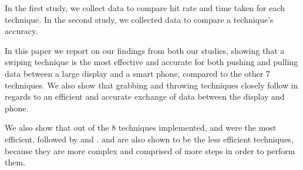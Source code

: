 In the first study, we collect data to compare hit rate and time taken for each technique.
In the second study, we collected data to compare a technique's accuracy.

In this paper we report on our findings from both our studies, showing that a swiping technique is the most effective and accurate for both pushing and pulling data between a large display and a smart phone, compared to the other 7 techniques. 
We also show that grabbing and throwing techniques closely follow in regards to an efficient and accurate exchange of data between the display and phone. 

We also show that out of the 8 techniques implemented, \swipe \push and \swipe \pull were the most efficient, followed by \throw \push and \throw \pull. 
\grab \push and \grab \pull are also shown to be the less efficient techniques, because they are more complex and comprised of more steps in order to perform them. 